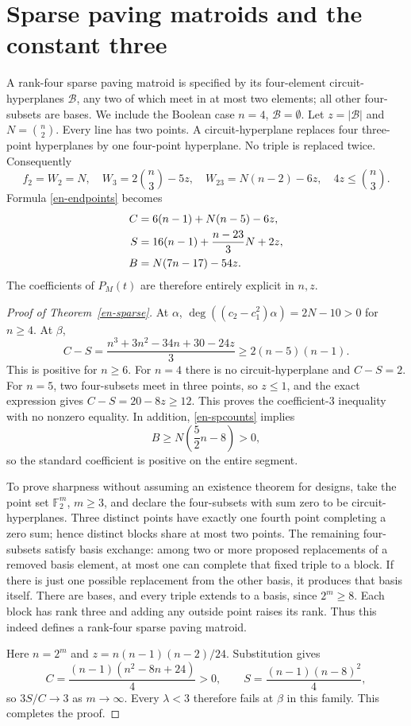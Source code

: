 \documentclass[12pt]{amsart}
\theoremstyle{definition}
\theoremstyle{remark}
\numberwithin{equation}{section}
\begin{document}
\section{Sparse paving matroids and the constant three}
A rank-four sparse paving matroid is specified by its four-element circuit-hyperplanes $\mathcal B$, any two of which meet in at most two elements; all other four-subsets are bases. We include the Boolean case $n=4$, $\mathcal B=\emptyset$. Let $z=|\mathcal B|$ and $N=\binom n2$. Every line has two points. A circuit-hyperplane replaces four three-point hyperplanes by one four-point hyperplane. No triple is replaced twice. Consequently
\begin{equation}\label{en-spcounts}
 f_2=W_2=N,\quad W_3=2\binom n3-5z,\quad
 W_{23}=N(n-2)-6z,\quad 4z\leq\binom n3.
\end{equation}
Formula \eqref{en-endpoints} becomes
\begin{align}\label{en-spchern}
 C&=6(n-1)+N(n-5)-6z,\notag\\
 S&=16(n-1)+\frac{n-23}{3}N+2z,\\
 B&=N(7n-17)-54z.\notag
\end{align}
The coefficients of $P_M(t)$ are therefore entirely explicit in $n,z$.

\begin{proof}[Proof of Theorem~\ref{en-sparse}]
At $\alpha$, $\deg((c_2-c_1^2)\alpha)=2N-10>0$ for $n\geq4$. At $\beta$,
\[
 C-S=\frac{n^3+3n^2-34n+30-24z}{3}
       \geq2(n-5)(n-1).
\]
This is positive for $n\geq6$. For $n=4$ there is no circuit-hyperplane and $C-S=2$. For $n=5$, two four-subsets meet in three points, so $z\leq1$, and the exact expression gives $C-S=20-8z\geq12$. This proves the coefficient-$3$ inequality with no nonzero equality. In addition, \eqref{en-spcounts} implies
\[
 B\geq N\left(\frac52n-8\right)>0,
\]
so the standard coefficient is positive on the entire segment.

To prove sharpness without assuming an existence theorem for designs, take the point set $\mathbb F_2^m$, $m\geq3$, and declare the four-subsets with sum zero to be circuit-hyperplanes. Three distinct points have exactly one fourth point completing a zero sum; hence distinct blocks share at most two points. The remaining four-subsets satisfy basis exchange: among two or more proposed replacements of a removed basis element, at most one can complete that fixed triple to a block. If there is just one possible replacement from the other basis, it produces that basis itself. There are bases, and every triple extends to a basis, since $2^m\geq8$. Each block has rank three and adding any outside point raises its rank. Thus this indeed defines a rank-four sparse paving matroid.

Here $n=2^m$ and $z=n(n-1)(n-2)/24$. Substitution gives
\[
 C=\frac{(n-1)(n^2-8n+24)}4>0,\qquad
 S=\frac{(n-1)(n-8)^2}4,
\]
so $3S/C\to3$ as $m\to\infty$. Every $\lambda<3$ therefore fails at $\beta$ in this family. This completes the proof.
\end{proof}
\end{document}
